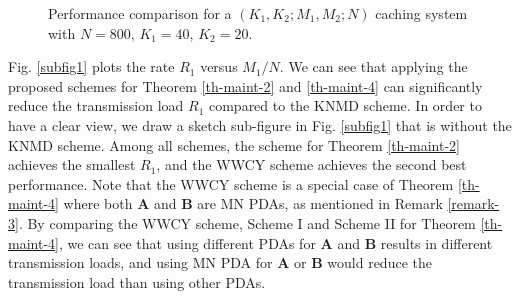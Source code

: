 \documentclass[onecolumn,10pt]{IEEEtran}
\theoremstyle{mythm}
\begin{document}
\begin{figure}
\centering
\subfigure[]
{
\texttt{[image: R\_1]}
\label{subfig1}
}
\subfigure[]{
\texttt{[image: R\_2]}
\label{subfig2}
}
\subfigure[]{
\texttt{[image: F]}
\label{subfig3}
}
\caption{Performance comparison for a  $(K_1,K_2;M_1,M_2;N)$ caching system with $N=800$, $K_1=40$, $K_2=20$.}
\label{per-analisis}
\end{figure}







Fig. \ref{subfig1} plots the rate $R_1$ versus  ${M_1}/{N}$. We can see that applying the proposed   schemes for Theorem \ref{th-maint-2} and \ref{th-maint-4}  can significantly reduce the transmission load $R_1$  compared to the KNMD scheme. In order to have a clear view, we draw a sketch sub-figure in Fig. \ref{subfig1} that is without the KNMD scheme. Among all schemes, the scheme for Theorem \ref{th-maint-2} achieves the smallest $R_1$, and  the WWCY scheme achieves the second best performance. Note that the WWCY scheme is a special case of Theorem \ref{th-maint-4} where both $\mathbf{A}$ and $\mathbf{B}$ are MN PDAs, as mentioned in Remark \ref{remark-3}. By comparing the WWCY scheme, Scheme I and Scheme II for Theorem \ref{th-maint-4}, we can see that using different PDAs for $\mathbf{A}$ and $\mathbf{B}$ results in different transmission loads,  and using MN PDA for   $\mathbf{A}$ or $\mathbf{B}$ would reduce the transmission load than using other PDAs. %
\end{document}
